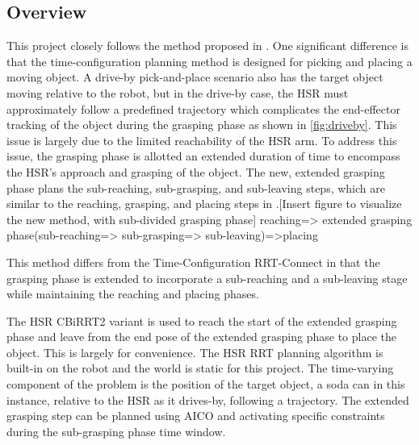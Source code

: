 \documentclass[12pt]{article}
\begin{document}
        \subsection{Overview}
            This project closely follows the method proposed in \cite{yang_planning_2018}. One significant difference is that the time-configuration planning method is designed for picking and placing a moving object. A drive-by pick-and-place scenario also has the target object moving relative to the robot, but in the drive-by case, the HSR must approximately follow a predefined trajectory which complicates the end-effector tracking of the object during the grasping phase as shown in \cref{fig:driveby}. This issue is largely due to the limited reachability of the HSR arm. To address this issue, the grasping phase is allotted an extended duration of time to encompass the HSR's approach and grasping of the object. The new, extended grasping phase plans the sub-reaching, sub-grasping, and sub-leaving steps, which are similar to the reaching, grasping, and placing steps in \cite{yang_planning_2018}.[Insert figure to visualize the new method, with sub-divided grasping phase] reaching=> extended grasping phase(sub-reaching=> sub-grasping=> sub-leaving)=>placing

            \par This method differs from the Time-Configuration RRT-Connect in that the grasping phase is extended to incorporate a sub-reaching and a sub-leaving stage while maintaining the reaching and placing phases. 

            \par The HSR CBiRRT2 variant is used to reach the start of the extended grasping phase and leave from the end pose of the extended grasping phase to place the object. This is largely for convenience. The HSR RRT planning algorithm is built-in on the robot and the world is static for this project. The time-varying component of the problem is the position of the target object, a soda can in this instance, relative to the HSR as it drives-by, following a trajectory. 
            The extended grasping step can be planned using AICO and activating specific constraints during the sub-grasping phase time window.
        
\end{document}
